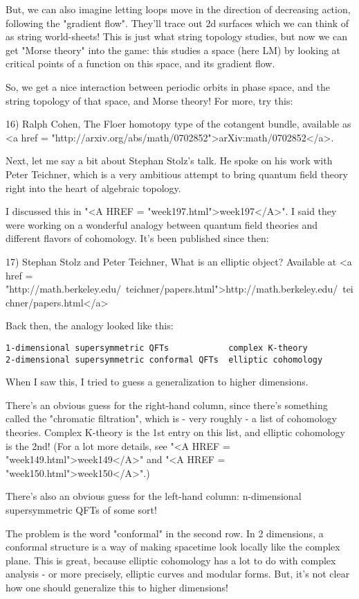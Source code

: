 But, we can also imagine letting loops move in the direction of 
decreasing action, following the "gradient flow".  They'll trace 
out 2d surfaces which we can think of as string world-sheets!
This is just what string topology studies, but now we can get 
"Morse theory" into the game: this studies a space (here LM)
by looking at critical points of a function on this space, and
its gradient flow.

So, we get a nice interaction between periodic orbits in phase
space, and the string topology of that space, and Morse theory!
For more, try this:

16) Ralph Cohen, The Floer homotopy type of the cotangent bundle,
available as <a href =
"http://arxiv.org/abs/math/0702852">arXiv:math/0702852</a>.

Next, let me say a bit about Stephan Stolz's talk.  He spoke
on his work with Peter Teichner, which is a very ambitious 
attempt to bring quantum field theory right into the heart of
algebraic topology.

I discussed this in "<A HREF = "week197.html">week197</A>".
I said they were working on a wonderful analogy between quantum field
theories and different flavors of cohomology.  It's been published
since then:

17) Stephan Stolz and Peter Teichner, What is an elliptic object? 
Available at <a href = "http://math.berkeley.edu/~teichner/papers.html">http://math.berkeley.edu/~teichner/papers.html</a>

Back then, the analogy looked like this:

\begin{verbatim}
1-dimensional supersymmetric QFTs            complex K-theory
2-dimensional supersymmetric conformal QFTs  elliptic cohomology
\end{verbatim}
    

When I saw this, I tried to guess a generalization to higher
dimensions.

There's an obvious guess for the right-hand column, since there's 
something called the "chromatic filtration", which is - very 
roughly - a list of cohomology theories.   Complex K-theory 
is the 1st entry on this list, and elliptic cohomology is the 2nd!  
(For a lot more details, see "<A HREF = "week149.html">week149</A>" and "<A HREF = "week150.html">week150</A>".)

There's also an obvious guess for the left-hand column:
n-dimensional supersymmetric QFTs of some sort!

The problem is the word "conformal" in the second row.  In
2 dimensions, a conformal structure is a way of making 
spacetime look locally like the complex plane.  This is great, 
because elliptic cohomology has a lot to do with complex 
analysis - or more precisely, elliptic curves and modular forms.  
But, it's not clear how one should generalize this to higher 
dimensions!

